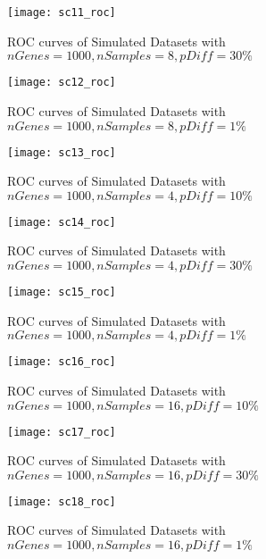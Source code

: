 \begin{figure}[h!tb] 
\texttt{[image: sc11\_roc]}
\caption{ROC curves of Simulated Datasets with $nGenes=1000, nSamples=8, pDiff=30\%$}
\label{sc11_roc}
\end{figure}

\begin{figure}[h!tb] 
\texttt{[image: sc12\_roc]}
\caption{ROC curves of Simulated Datasets with $nGenes=1000, nSamples=8, pDiff=1\%$}
\label{sc12_roc}
\end{figure}


\begin{figure}[h!tb] 
\texttt{[image: sc13\_roc]}
\caption{ROC curves of Simulated Datasets with $nGenes=1000, nSamples=4, pDiff=10\%$}
\label{sc13_roc}
\end{figure}


\begin{figure}[h!tb] 
\texttt{[image: sc14\_roc]}
\caption{ROC curves of Simulated Datasets with $nGenes=1000, nSamples=4, pDiff=30\%$}
\label{sc14_roc}
\end{figure}


\begin{figure}[h!tb] 
\texttt{[image: sc15\_roc]}
\caption{ROC curves of Simulated Datasets with $nGenes=1000, nSamples=4, pDiff=1\%$}
\label{sc15_roc}
\end{figure}

\begin{figure}[h!tb] 
\texttt{[image: sc16\_roc]}
\caption{ROC curves of Simulated Datasets with $nGenes=1000, nSamples=16, pDiff=10\%$}
\label{sc16_roc}
\end{figure}

\begin{figure}[h!tb] 
\texttt{[image: sc17\_roc]}
\caption{ROC curves of Simulated Datasets with $nGenes=1000, nSamples=16, pDiff=30\%$}
\label{sc17_roc}
\end{figure}

\begin{figure}[h!tb] 
\texttt{[image: sc18\_roc]}
\caption{ROC curves of Simulated Datasets with $nGenes=1000, nSamples=16, pDiff=1\%$}
\label{sc18_roc}
\end{figure}
